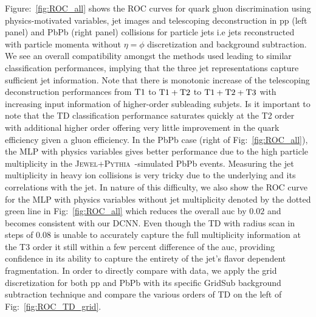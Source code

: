 \documentclass[notoc]{JHEP3}
\newcommand{\jwpy}{\textsc{Jewel+Pythia}~}
\begin{document}
Figure:~\ref{fig:ROC_all} shows the ROC curves for quark gluon discrimination using physics-motivated variables, jet images and telescoping deconstruction in pp (left panel) and PbPb (right panel) collisions for particle jets i.e jets reconstructed with particle momenta without $\eta=\phi$ discretization and background subtraction. We see an overall compatibility amongst the methods used leading to similar classification performances, implying that the three jet representations capture sufficient jet information. Note that there is monotonic increase of the telescoping deconstruction performances from $\rm T1$ to $\rm T1+T2$ to $\rm T1+T2+T3$ with increasing input information of higher-order subleading subjets. Is it important to note that the TD classification performance saturates quickly at the T2 order with additional higher order offering very little improvement in the quark efficiency given a gluon efficiency. In the PbPb case (right of Fig:~\ref{fig:ROC_all}), the MLP with physics variables gives better performance due to the high particle multiplicity in the \jwpy-simulated PbPb events. Measuring the jet multiplicity in heavy ion collisions is very tricky due to the underlying and its correlations with the jet. In nature of this difficulty, we also show the ROC curve for the MLP with physics variables without jet multiplicity denoted by the dotted green line in Fig:~\ref{fig:ROC_all} which reduces the overall auc by $0.02$ and becomes consistent with our DCNN. Even though the TD with radius scan in steps of 0.08 is unable to accurately capture the full multiplicity information at the T3 order it still within a few percent difference of the auc, providing confidence in its ability to capture the entirety of the jet's flavor dependent fragmentation. In order to directly compare with data, we apply the grid discretization for both pp and PbPb with its specific GridSub background subtraction technique and compare the various orders of TD on the left of Fig:~\ref{fig:ROC_TD_grid}. 
\end{document}
